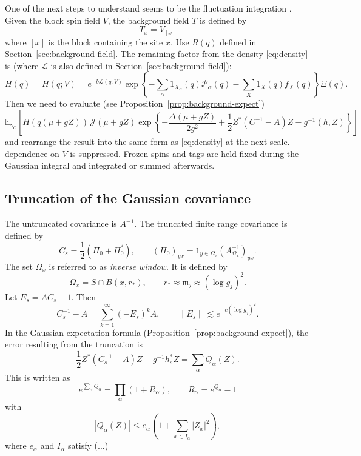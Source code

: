 \documentclass[11pt]{article}
\newcommand{\E}{\mathbb E}
\numberwithin{equation}{section}
\theoremstyle{definition}
\theoremstyle{plain}
\begin{document}
One of the next steps to understand seems to be the fluctuation integration \cite[Section 5.4]{OpenAI-O4}. Given the block spin field $V$,
the background field $T$ is defined by
\begin{equation}
  T_x = V_{[x]}
\end{equation}
where $[x]$ is the block containing the site $x$. Use $R(q)$ defined in Section~\ref{sec:background-field}.
The remaining factor from the density \eqref{eq:density} is (where $\mathcal L$ is also defined in Section~\ref{sec:background-field}):
\begin{equation}
  H(q)= H(q;V)=e^{-b\mathcal L(q,V)}
 \exp\!\left\{
 -\sum_\alpha1_{X_\alpha}(q)\mathcal P_\alpha(q)
 -\sum_X1_X(q)f_X(q)
 \right\}\Xi(q).
 \label{eq:remaining-factor}
\end{equation}
Then we need to evaluate (see Proposition~\ref{prop:background-expect})
\begin{equation}
\E_{\gamma_C}\left[
 H(q(\mu+gZ))\,\mathcal J(\mu+gZ)
 \exp\!\left\{
 -\frac{\Delta(\mu+gZ)}{2g^2}
 +\frac12 Z^*(C^{-1}-A)Z
 -g^{-1}(h,Z)
 \right\}\right]
\end{equation}
and rearrange the result into the same form as \eqref{eq:density} at the next scale.
dependence on $V$ is suppressed.
%
Frozen spins and tags are held fixed during the Gaussian integral and integrated or summed afterwards.

\subsection{Truncation of the Gaussian covariance}

The untruncated covariance is $A^{-1}$. The truncated finite range covariance is defined by
\begin{equation}
  C_s = \frac12 (\Pi_0+\Pi_0^*), \qquad (\Pi_0)_{yx} = 1_{y\in\Omega_x} (A_{\Omega_x}^{-1})_{yx}
  .
\end{equation}
The set $\Omega_x$ is referred to as \emph{inverse window}. It is defined by
\begin{equation}
  \Omega_x = S \cap B(x,r_*), \qquad r_* \approx \mathfrak m_j \approx (\log g_j)^2.
\end{equation}
Let $E_{s} = AC_s-1$. Then
\begin{equation}
  C_s^{-1}-A = \sum_{k=1}^\infty (-E_s)^{k}A,
  \qquad
  \|E_s\| \lesssim e^{-c(\log g_j)^2}.
\end{equation}
In the Gaussian expectation formula (Proposition~\ref{prop:background-expect}),
the error resulting from the truncation is
\begin{equation}
 \frac12Z^*(C_s^{-1}-A)Z-g^{-1}h_s^*Z=\sum_\alpha Q_\alpha(Z).
\end{equation}
This is written as
\begin{equation}
 e^{\sum_\alpha Q_\alpha}
 =\prod_\alpha(1+R_\alpha),\qquad
 R_\alpha=e^{Q_\alpha}-1
 \label{eq:ratio-factors}
\end{equation}
with
\begin{equation}
 |Q_\alpha(Z)|\le e_\alpha
 \left(1+\sum_{x\in I_\alpha}|Z_x|^2\right),
 \label{eq:envelope}
\end{equation}
where $e_\alpha$ and $I_\alpha$ satisfy (...)
\end{document}
